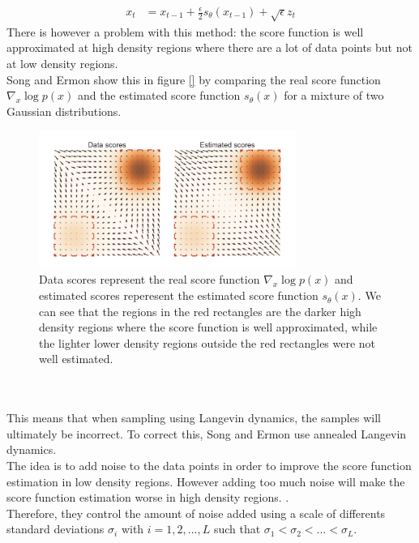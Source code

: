 \documentclass{article}
\begin{document}
\begin{align}
  x_t &= x_{t-1} + \frac{\epsilon}{2} s_\theta (x_{t-1}) + \sqrt{\epsilon} z_t
\end{align}
There is however a problem with this method: the score function is well approximated at high density regions where there are a lot of data points but not at low density regions. \cite{song2020generative} \\
Song and Ermon \cite{song2020generative} show this in figure \ref{} by comparing the real score function $\nabla_x \log p(x)$ and the estimated score function $s_\theta (x)$ for a mixture of two Gaussian distributions.
\begin{figure}[h]
  \begin{center}
    \includegraphics[width= 0.75\textwidth]{images/highlowdensity.png}
    \caption{Data scores represent the real score function $\nabla_x \log p(x)$ and estimated scores reperesent the estimated score function $s_\theta (x)$. We can see that the regions in the red rectangles are the darker high density regions where the score function is well approximated, while the lighter lower density regions outside the red rectangles were not well estimated. \cite{song2020generative}}
  \end{center}
\end{figure}
\\\\
This means that when sampling using Langevin dynamics, the samples will ultimately be incorrect. \cite{song2020generative} 
To correct this, Song and Ermon \cite{song2020generative} use annealed Langevin dynamics. \\
The idea is to add noise to the data points in order to improve the score function estimation in low density regions. \cite{songblog} However adding too much noise will make the score function estimation worse in high density regions. \cite{songblog}. \\
Therefore, they control the amount of noise added using a scale of differents standard deviations $\sigma_i$ with $i = 1, 2, ..., L$ such that $\sigma_1 < \sigma_2 < ... < \sigma_L$. \cite{songblog,song2020generative} \\
\end{document}
